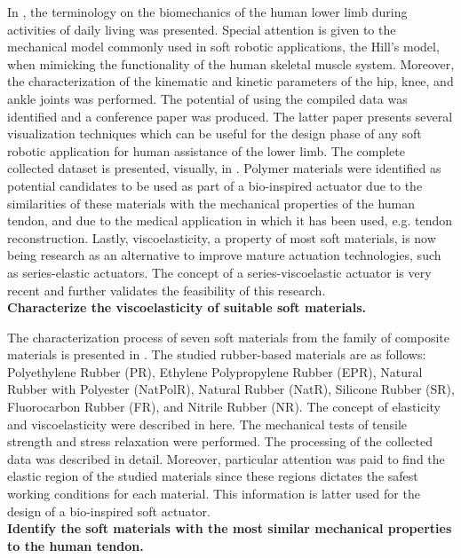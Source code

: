 In , the terminology on the biomechanics of the human lower limb during activities of daily living was presented. Special attention is given to the mechanical model commonly used in soft robotic applications, the Hill's model, when mimicking the functionality of the human skeletal muscle system. Moreover, the characterization of the kinematic and kinetic parameters of the hip, knee, and ankle joints was performed. The potential of using the compiled data was identified and a conference paper was produced. The latter paper presents several visualization techniques which can be useful for the design phase of any soft robotic application for human assistance of the lower limb. The complete collected dataset is presented, visually, in . Polymer materials were identified as potential candidates to be used as part of a bio-inspired actuator due to the similarities of these materials with the mechanical properties of the human tendon, and due to the medical application in which it has been used, e.g. tendon reconstruction. Lastly, viscoelasticity, a property of most soft materials, is now being research as an alternative to improve mature actuation technologies, such as series-elastic actuators. The concept of a series-viscoelastic actuator is very recent and further validates the feasibility of this research.
\\[1em]
\noindent \textbf{\large{ Characterize the viscoelasticity of suitable soft materials.}}

The characterization process of seven soft materials from the family of composite materials is presented in . The studied rubber-based materials are as follows: Polyethylene Rubber (PR), Ethylene Polypropylene Rubber (EPR), Natural Rubber with Polyester (NatPolR), Natural Rubber (NatR), Silicone Rubber (SR), Fluorocarbon Rubber (FR), and Nitrile Rubber (NR). The concept of elasticity and viscoelasticity were described in here. The mechanical tests of tensile strength and stress relaxation were performed. The processing of the collected data was described in detail. Moreover, particular attention was paid to find the elastic region of the studied materials since these regions dictates the safest working conditions for each material. This information is latter used for the design of a bio-inspired soft actuator.
\\[1em]
\noindent \textbf{\large{ Identify the soft materials with the most similar mechanical properties to the human tendon.}}

